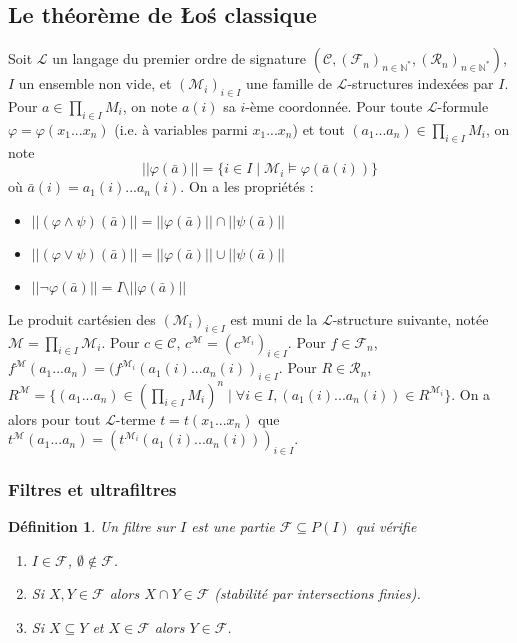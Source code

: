 \documentclass[11pt,a4paper]{article}
\newtheorem{defi}[theo]{Définition}
\newcommand{\La}{\mathcal{L}}
\newcommand{\M}{\mathcal{M}}
\newcommand{\ph}{\varphi}
\newcommand{\itemz}{\item[$\triangleright$]}
\newcommand{\F}{\mathcal{F}}
\newcommand{\N}{\mathbb{N}}
\newcommand{\R}{\mathcal{R}}
\newcommand{\C}{\mathcal{C}}
\newcommand{\1}{\mathbbm{1}}
\begin{document}
\subsection{Le théorème de \L{}o\'s classique}
Soit $\La$ un langage du premier ordre de signature $(\C,(\F_n)_{n\in \N^*}, (\R_n)_{n\in \N^*})$, $I$ un ensemble non vide, et $(\M_i)_{i\in I}$ une famille de $\La$-structures indexées par $I$. Pour $a \in \prod_{i\in I} M_i$, on note $a(i)$ sa $i$-ème coordonnée. Pour toute $\La$-formule $\ph = \ph(x_1...x_n)$ (i.e. à variables parmi $x_1...x_n$) et tout $(a_1...a_n) \in \prod_{i\in I} M_i$, on note 
\[ ||\ph(\bar{a})|| = \{ i \in I \mid \M_i \models \ph(\bar{a}(i))\} \]
où $\bar{a}(i) = a_1(i)...a_n(i)$. On a les propriétés :
\begin{itemize}
\setlength\itemsep{-0.3em}
\itemz $|| (\ph \wedge \psi) (\bar{a}) || = || \ph (\bar{a}) || \cap || \psi (\bar{a}) ||$
\itemz $|| (\ph \vee \psi) (\bar{a}) || = || \ph (\bar{a}) || \cup || \psi (\bar{a}) ||$
\itemz $|| \neg\ph (\bar{a}) || = I \setminus || \ph (\bar{a}) ||$
\end{itemize}
Le produit cartésien des $(\M_i)_{i\in I}$ est muni de la $\La$-structure suivante, notée $\M = \prod_{i\in I} \M_i$. Pour $c \in \C$, $c^\M = (c^{\M_i})_{i\in I}$. Pour $f \in \F_n$, $f^\M(a_1...a_n) = (f^{\M_i}(a_1(i)...a_n(i))_{i\in I}$. Pour $R \in \R_n$, $R^\M = \{(a_1...a_n) \in (\prod_{i\in I} M_i)^n \mid \forall i \in I, (a_1(i)...a_n(i)) \in R^{\M_i}\}$. On a alors pour tout $\La$-terme $t = t(x_1...x_n)$ que $t^\M (a_1...a_n) = (t^{\M_i}(a_1(i)...a_n(i)))_{i\in I}$.
\subsubsection{Filtres et ultrafiltres}
\begin{defi}
Un filtre sur $I$ est une partie $\F \subseteq P(I)$ qui vérifie
\begin{enumerate}
\setlength\itemsep{-0.3em}
\item[(i)] $I \in \F$, $\emptyset \notin \F$.
\item[(ii)] Si $X,Y \in \F$ alors $X \cap Y \in \F$ (stabilité par intersections finies).
\item[(iii)] Si $X \subseteq Y$ et $X \in \F$ alors $Y \in \F$.
\end{enumerate}
\end{defi}
\end{document}
